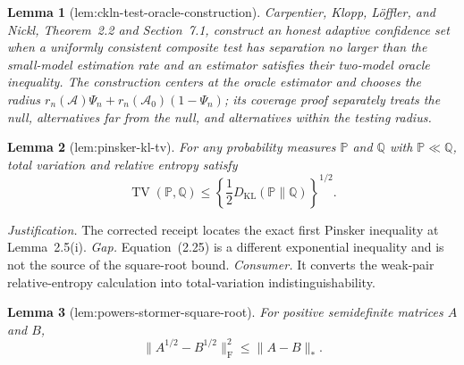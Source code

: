 \documentclass{article}
\newtheorem{lemma}{Lemma}
\begin{document}
\begin{lemma}[lem:ckln-test-oracle-construction]\label{lem:ckln-test-oracle-construction}
Carpentier, Klopp, L\"offler, and Nickl, Theorem~2.2 and Section~7.1, construct an honest adaptive confidence set when a uniformly consistent composite test has separation no larger than the small-model estimation rate and an estimator satisfies their two-model oracle inequality.  The construction centers at the oracle estimator and chooses the radius \(r_n(\mathcal A)\Psi_n+r_n(\mathcal A_0)(1-\Psi_n)\); its coverage proof separately treats the null, alternatives far from the null, and alternatives within the testing radius.
\end{lemma}

\begin{lemma}[lem:pinsker-kl-tv]\label{lem:pinsker-kl-tv}
For any probability measures \(\mathbb P\) and \(\mathbb Q\) with
\(\mathbb P\ll\mathbb Q\), total variation and relative entropy satisfy
\[
\operatorname{TV}(\mathbb P,\mathbb Q)
\leq\left\{\frac12D_{\mathrm{KL}}(\mathbb P\|\mathbb Q)\right\}^{1/2}.
\]
\end{lemma}
\par\smallskip\noindent \textit{Justification.} The corrected receipt locates the exact first Pinsker inequality at Lemma~2.5(i). \textit{Gap.} Equation~(2.25) is a different exponential inequality and is not the source of the square-root bound. \textit{Consumer.} It converts the weak-pair relative-entropy calculation into total-variation indistinguishability.

\begin{lemma}[lem:powers-stormer-square-root]\label{lem:powers-stormer-square-root}
For positive semidefinite matrices \(A\) and \(B\), \[\|A^{1/2}-B^{1/2}\|_{\mathrm F}^2\le\|A-B\|_*.\]
\end{lemma}
\end{document}
